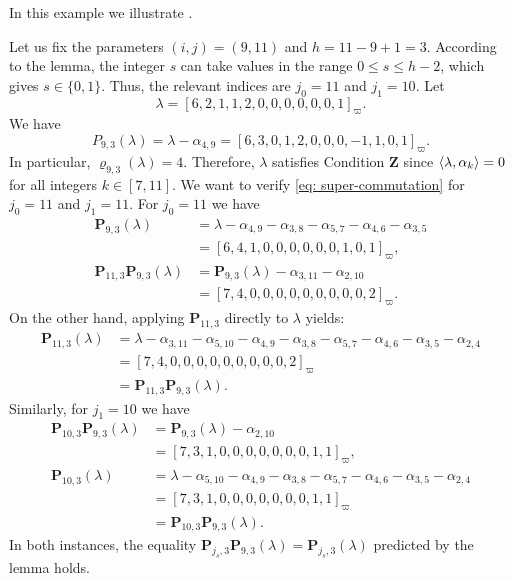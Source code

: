 \begin{example}\label{exa:  conmutation}  \rm
In this example we illustrate  .

Let us fix the parameters $(i, j) = (9, 11)$ and $h = 11 - 9 + 1 = 3$. According to the lemma, the integer $s$ can take values in the range $0 \le s \le h-2$, which gives $s \in \{0, 1\}$. 
Thus, the relevant indices are $j_0 = 11$ and $j_1 = 10$. 
Let
\[
    \lambda = [6, 2, 1, 1, 2, 0, 0, 0, 0, 0, 0, 1]_\varpi.
\]
We have
\begin{equation}
    P_{9,3}(\lambda) = \lambda - \alpha_{4,9} = [6, 3, 0, 1, 2, 0, 0, 0, -1, 1, 0, 1]_\varpi .
\end{equation}
In particular,  $\varrho_{9,3}(\lambda) = 4$. 
Therefore, $\lambda$ satisfies Condition $\mathbf{Z}$ since $\langle \lambda , \alpha_k \rangle =0$ for all integers $k\in [7,11]$. 
We want to  verify \eqref{eq: super-commutation} for $j_0=11$ and $j_1=11$. 
For $j_0=11$ we have 
\begin{equation}
\begin{aligned}
    \mathbf{P}_{9,3}(\lambda) &= \lambda - \alpha_{4,9} - \alpha_{3,8} - \alpha_{5,7} - \alpha_{4,6} - \alpha_{3,5} \\
    &= [6, 4, 1, 0, 0, 0, 0, 0, 0, 1, 0, 1]_\varpi, \\[5pt]
    \mathbf{P}_{11,3}\mathbf{P}_{9,3}(\lambda) &= \mathbf{P}_{9,3}(\lambda) - \alpha_{3,11} - \alpha_{2,10} \\
    &= [7, 4, 0, 0, 0, 0, 0, 0, 0, 0, 0, 2]_\varpi.
\end{aligned}
\end{equation}
On the other hand, applying $\mathbf{P}_{11,3}$ directly to $\lambda$ yields:
\begin{equation}
\begin{aligned}
    \mathbf{P}_{11,3}(\lambda) &= \lambda - \alpha_{3,11} - \alpha_{5,10} - \alpha_{4,9} -\alpha_{3,8} - \alpha_{5,7} - \alpha_{4,6} - \alpha_{3,5} - \alpha_{2,4} \\
    &= [7, 4, 0, 0, 0, 0, 0, 0, 0, 0, 0, 2]_\varpi \\
    & = \mathbf{P}_{11,3}\mathbf{P}_{9,3}(\lambda).
\end{aligned}
\end{equation}
Similarly, for $j_1 = 10$ we have
\begin{equation}
\begin{aligned}
    \mathbf{P}_{10,3}\mathbf{P}_{9,3}(\lambda) &= \mathbf{P}_{9,3}(\lambda) - \alpha_{2,10} \\
    &= [7, 3, 1, 0, 0, 0, 0, 0, 0, 0, 1, 1]_\varpi, \\[5pt]
    \mathbf{P}_{10,3}(\lambda) &= \lambda - \alpha_{5,10} - \alpha_{4,9} - \alpha_{3,8} - \alpha_{5,7} - \alpha_{4,6}- \alpha_{3,5} - \alpha_{2,4} \\
    &= [7, 3, 1, 0, 0, 0, 0, 0, 0, 0, 1, 1]_\varpi \\ &= \mathbf{P}_{10,3}\mathbf{P}_{9,3}(\lambda).
\end{aligned}
\end{equation}
In both instances, the equality $\mathbf{P}_{j_s, 3}\mathbf{P}_{9,3}(\lambda) = \mathbf{P}_{j_s, 3}(\lambda)$ predicted by the lemma holds. 
\end{example}
